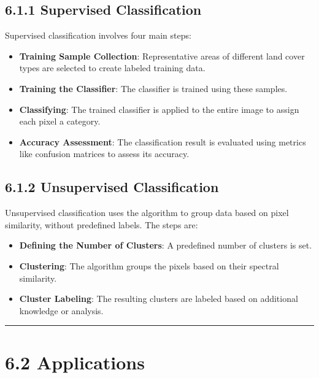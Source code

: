 \documentclass[
  letterpaper,
  DIV=11,
  numbers=noendperiod]{scrreprt}
\begin{document}
\subsection{6.1.1 Supervised
Classification}\label{supervised-classification}

Supervised classification involves four main steps:

\begin{itemize}
\item
  \textbf{Training Sample Collection}: Representative areas of different
  land cover types are selected to create labeled training data.
\item
  \textbf{Training the Classifier}: The classifier is trained using
  these samples.
\item
  \textbf{Classifying}: The trained classifier is applied to the entire
  image to assign each pixel a category.
\item
  \textbf{Accuracy Assessment}: The classification result is evaluated
  using metrics like confusion matrices to assess its accuracy.
\end{itemize}

\subsection{6.1.2 Unsupervised
Classification}\label{unsupervised-classification}

Unsupervised classification uses the algorithm to group data based on
pixel similarity, without predefined labels. The steps are:

\begin{itemize}
\item
  \textbf{Defining the Number of Clusters}: A predefined number of
  clusters is set.
\item
  \textbf{Clustering}: The algorithm groups the pixels based on their
  spectral similarity.
\item
  \textbf{Cluster Labeling}: The resulting clusters are labeled based on
  additional knowledge or analysis.
\end{itemize}

\begin{center}\rule{0.5\linewidth}{0.5pt}\end{center}

\section{6.2 Applications}\label{applications-3}
\end{document}
